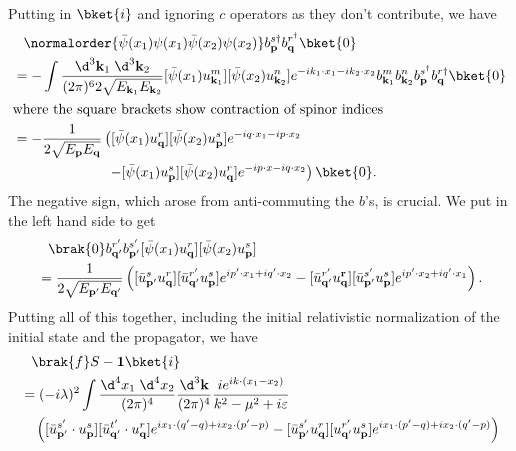 \documentclass[a4paper]{article}
\begin{document}
\begin{eg}
  Putting in $\bket{i}$ and ignoring $c$ operators as they don't contribute, we have
  \begin{align*}
    &\hphantom{=}\normalorder{\bar\psi(x_1)\psi(x_1) \bar\psi(x_2) \psi(x_2)} b_\mathbf{p}^{s\dagger}b_{\mathbf{q}}^{r^\dagger}\bket{0}\\
    &= -\int \frac{\d^3 \mathbf{k}_1\;\d^3 \mathbf{k}_2}{(2\pi)^6 2\sqrt{E_{\mathbf{k}_1}E_{\mathbf{k}_2}}} [\bar\psi (x_1) u_{\mathbf{k}_1}^m] [\bar\psi(x_2) u_{\mathbf{k}_2}^n] e^{-ik_1 \cdot x_1 - i k_2 \cdot x_2} b_{\mathbf{k}_1}^m b_{\mathbf{k}_2}^n b_{\mathbf{p}}^{s^\dagger} b_\mathbf{q}^{r\dagger}\bket{0}\\
    \intertext{where the square brackets show contraction of spinor indices}
    &= -\frac{1}{2\sqrt{E_\mathbf{p} E_\mathbf{q}}} \left([\bar\psi(x_1) u_\mathbf{q}^r] [\bar\psi(x_2) u_\mathbf{p}^s] e^{-iq\cdot x_1 - ip\cdot x_2}\right. \\
    &\hphantom{= -\frac{1}{2\sqrt{E_\mathbf{p} E_\mathbf{q}}} \Big(}\left.- [\bar\psi(x_1) u_\mathbf{p}^s][\bar\psi(x_2) u_\mathbf{q}^r] e^{-ip\cdot x - iq\cdot x_2}\right)\bket{0}.
  \end{align*}
  The negative sign, which arose from anti-commuting the $b$'s, is crucial. We put in the left hand side to get
  \begin{align*}
    &\hphantom{=}\brak{0}b_{\mathbf{q}'}^{r'} b_{\mathbf{p}'}^{s'} [\bar\psi(x_1) u_\mathbf{q}^r][\bar\psi(x_2) u_\mathbf{p}^s]\\
    &= \frac{1}{2\sqrt{E_{\mathbf{p}'} E_{\mathbf{q}'}}} \left([\bar u_{\mathbf{p}'}^s u_\mathbf{q}^r][\bar u_{\mathbf{q}'}^{r'} u_\mathbf{p}^s] e^{ip'\cdot x_1 + i q'\cdot x_2} -[\bar{u}_{\mathbf{q}'}^{r'} u_\mathbf{q}^\mathbf{r}][\bar u_{\mathbf{p}'}^{s'} u_{\mathbf{p}}^s] e^{ip'\cdot x_2 + i q'\cdot x_1}\right).
  \end{align*}
  Putting all of this together, including the initial relativistic normalization of the initial state and the propagator, we have
  \begin{align*}
    &\hphantom{=}\brak{f}S - \mathbf{1}\bket{i} \\
    &= (-i\lambda)^2 \int \frac{\d^4 x_1 \; \d^4 x_2}{(2\pi)^4} \frac{\d^3 \mathbf{k}}{(2\pi)^4} \frac{ie^{ik\cdot (x_1 - x_2)}}{k^2 - \mu^2 + i \varepsilon}\\
    &\quad\left([\bar u_{\mathbf{p}'}^{s'} \cdot u_{\mathbf{p}}^s][\bar u_{\mathbf{q}'}^{t'} \cdot u_\mathbf{q}^r] e^{i x_1 \cdot (q' - q) + i x_2 \cdot (p' - p)} - [\bar{u}_{\mathbf{p}'}^{s'}u_\mathbf{q}^r][u_{\mathbf{q}'}^{r'} u_\mathbf{p}^s] e^{ix_1 \cdot (p' - q) + i x_2 \cdot (q' - p)}\right)\\

\end{align*}
\end{eg}
\end{document}
